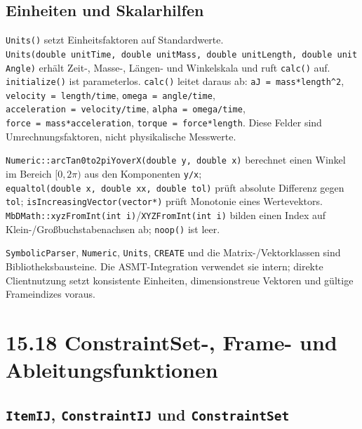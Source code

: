 \documentclass[
  12pt
]{book}
\begin{document}
\hypertarget{einheiten-und-skalarhilfen}{%
\subsection*{Einheiten und
Skalarhilfen}\label{einheiten-und-skalarhilfen}}

\texttt{Units()} setzt Einheitsfaktoren auf Standardwerte.
\texttt{Units(double\ unitTime,\ double\ unitMass,\ double\ unitLength,\ double\ unitAngle)}
erhält Zeit-, Masse-, Längen- und Winkelskala und ruft \texttt{calc()}
auf. \texttt{initialize()} ist parameterlos. \texttt{calc()} leitet
daraus ab: \texttt{aJ\ =\ mass*length\^{}2},
\texttt{velocity\ =\ length/time}, \texttt{omega\ =\ angle/time},
\texttt{acceleration\ =\ velocity/time}, \texttt{alpha\ =\ omega/time},
\texttt{force\ =\ mass*acceleration}, \texttt{torque\ =\ force*length}.
Diese Felder sind Umrechnungsfaktoren, nicht physikalische Messwerte.

\texttt{Numeric::arcTan0to2piYoverX(double\ y,\ double\ x)} berechnet
einen Winkel im Bereich \([0,2\pi)\) aus den Komponenten \texttt{y/x};
\texttt{equaltol(double\ x,\ double\ xx,\ double\ tol)} prüft absolute
Differenz gegen \texttt{tol}; \texttt{isIncreasingVector(vector*)} prüft
Monotonie eines Wertevektors.
\texttt{MbDMath::xyzFromInt(int\ i)}/\texttt{XYZFromInt(int\ i)} bilden
einen Index auf Klein-/Großbuchstabenachsen ab; \texttt{noop()} ist
leer.

\texttt{SymbolicParser}, \texttt{Numeric}, \texttt{Units},
\texttt{CREATE} und die Matrix-/Vektorklassen sind Bibliotheksbausteine.
Die ASMT-Integration verwendet sie intern; direkte Clientnutzung setzt
konsistente Einheiten, dimensionstreue Vektoren und gültige Frameindizes
voraus.

\hypertarget{constraintset--frame--und-ableitungsfunktionen}{%
\section{\texorpdfstring{{15.18} ConstraintSet-, Frame- und
Ableitungsfunktionen}{15.18 ConstraintSet-, Frame- und Ableitungsfunktionen}}\label{constraintset--frame--und-ableitungsfunktionen}}

\hypertarget{itemij-constraintij-und-constraintset}{%
\subsection*{\texorpdfstring{\texttt{ItemIJ}, \texttt{ConstraintIJ} und
\texttt{ConstraintSet}}{ItemIJ, ConstraintIJ und ConstraintSet}}\label{itemij-constraintij-und-constraintset}}
\end{document}
